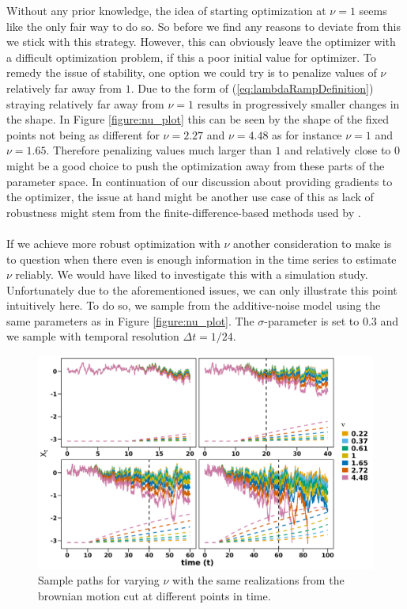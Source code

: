 Without any prior knowledge, the idea of starting optimization at $\nu = 1$ seems like the only fair way to do so. So before we find any reasons to deviate from this we stick with this strategy. However, this can obviously leave the optimizer with a difficult optimization problem, if this a poor initial value for optimizer. To remedy the issue of stability, one option we could try is to penalize values of $\nu$ relatively far away from $1$. Due to the form of (\ref{eq:lambdaRampDefinition}) straying relatively far away from $\nu = 1$ results in progressively smaller changes in the shape. In Figure \ref{figure:nu_plot} this can be seen by the shape of the fixed points not being as different for $\nu = 2.27$ and $\nu = 4.48$ as for instance $\nu = 1$ and $\nu = 1.65$. Therefore penalizing values much larger than $1$ and relatively close to $0$ might be a good choice to push the optimization away from these parts of the parameter space. In continuation of our discussion about providing gradients to the optimizer, the issue at hand might be another use case of this as lack of robustness might stem from the finite-difference-based methods used by . \\\\
If we achieve more robust optimization with $\nu$ another consideration to make is to question when there even is enough information in the time series to estimate $\nu$ reliably. We would have liked to investigate this with a simulation study. Unfortunately due to the aforementioned issues, we can only illustrate this point intuitively here. To do so, we sample from the additive-noise model using the same parameters as in Figure \ref{figure:nu_plot}. The $\sigma$-parameter is set to $0.3$ and we sample with temporal resolution $\Delta t = 1/24$.
\begin{figure}[h!]
    \begin{center}
    \includegraphics[scale = .13]{figures/mu_simulations_discussion_plot.jpeg}
    \caption{Sample paths for varying $\nu$ with the same realizations from the brownian motion cut at different points in time.}
    \label{figure:mu_simulations_discussion_plot}
    \end{center}
\end{figure}\\
